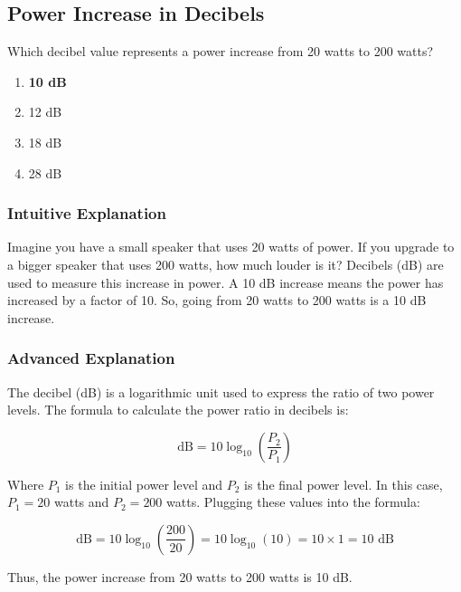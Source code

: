 \subsection{Power Increase in Decibels}
\label{T5B11}

\begin{tcolorbox}[colback=gray!10!white,colframe=black!75!black,title=T5B11]
Which decibel value represents a power increase from 20 watts to 200 watts?
\begin{enumerate}[noitemsep]
    \item \textbf{10 dB}
    \item 12 dB
    \item 18 dB
    \item 28 dB
\end{enumerate}
\end{tcolorbox}

\subsubsection{Intuitive Explanation}
Imagine you have a small speaker that uses 20 watts of power. If you upgrade to a bigger speaker that uses 200 watts, how much louder is it? Decibels (dB) are used to measure this increase in power. A 10 dB increase means the power has increased by a factor of 10. So, going from 20 watts to 200 watts is a 10 dB increase.

\subsubsection{Advanced Explanation}
The decibel (dB) is a logarithmic unit used to express the ratio of two power levels. The formula to calculate the power ratio in decibels is:

\[
\text{dB} = 10 \log_{10}\left(\frac{P_2}{P_1}\right)
\]

Where \( P_1 \) is the initial power level and \( P_2 \) is the final power level. In this case, \( P_1 = 20 \) watts and \( P_2 = 200 \) watts. Plugging these values into the formula:

\[
\text{dB} = 10 \log_{10}\left(\frac{200}{20}\right) = 10 \log_{10}(10) = 10 \times 1 = 10 \text{ dB}
\]

Thus, the power increase from 20 watts to 200 watts is 10 dB.